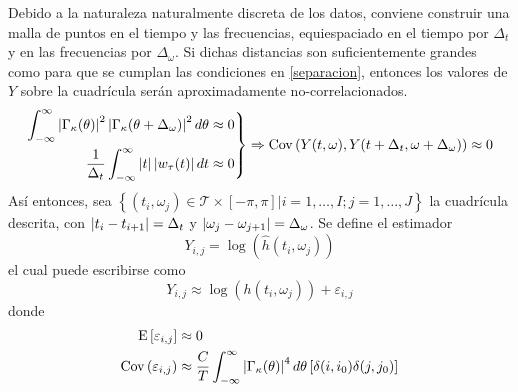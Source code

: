 Debido a la naturaleza naturalmente discreta de los datos, conviene construir una malla de puntos en el tiempo y las frecuencias, equiespaciado en el tiempo por $\Delta_t$ y en las frecuencias por $\Delta_\omega$.
Si dichas distancias son suficientemente grandes
como para que se cumplan las condiciones en \ref{separacion}, entonces los valores de $Y$
sobre la cuadrícula serán aproximadamente no-correlacionados.
%
\begin{equation}
\left.
\begin{aligned}
\int_{-\infty}^{\infty} \left| \Gamma_\kappa(\theta) \right|^{2}\left| \Gamma_\kappa(\theta+\Delta_\omega) \right|^{2} d\theta 
&\approx 0 \\
\frac{1}{\Delta_t} \int_{-\infty}^{\infty} \left| t \right| \left| w_\tau (t) \right| dt &\approx 0
\end{aligned}
\right\rbrace
\Rightarrow
\mathrm{Cov}\left( Y(t,\omega),Y(t+\Delta_t,\omega+\Delta_\omega) \right) \approx 0
\label{separacion}
\end{equation}
%
Así entonces, sea
$\left\{ (t_i,\omega_j) \in \mathcal{T} \times [-\pi,\pi] | i = 1,\dots,I ; j=1,\dots,J \right\}$
la cuadrícula descrita, con $\left| t_i - t_{i+1} \right|= \Delta_t$ y 
$\left| \omega_j-\omega_{j+1} \right|= \Delta_\omega$. 
%
Se define el estimador
\begin{equation}
Y_{i,j} = \log\left(\widehat{h}(t_i,\omega_j)\right)
\end{equation}
%
el cual puede escribirse como
\begin{equation}
Y_{i,j} \approx \log\left(h(t_i,\omega_j)\right) + \varepsilon_{i,j}
\label{def:ye}
\end{equation}
donde
\begin{align}
\mathrm{E}\left[ \varepsilon_{i,j} \right] &\approx 0 \\
\mathrm{Cov}\left( \varepsilon_{i,j} \right) &\approx
\frac{C}{T} \int_{-\infty}^{\infty} \left| \Gamma_\kappa(\theta) \right|^{4} d\theta \left[ \delta(i,i_0)\delta(j,j_0) \right]
\end{align}


